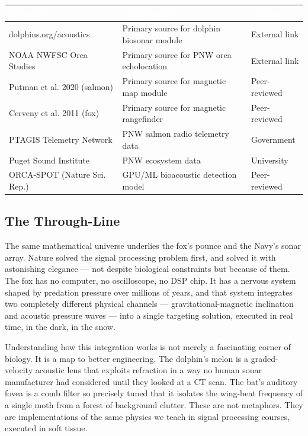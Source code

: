 \documentclass[11pt,letterpaper]{article}
\newcommand{\tableheader}[1]{\textbf{\sffamily\textcolor{white}{#1}}}
\begin{document}
\begin{center}
\begin{tabularx}{\textwidth}{L{3.5cm}XL{2.5cm}}
\toprule
{}
\tableheader{Document} & \tableheader{Relationship} & \tableheader{Status} \\
\midrule
dolphins.org/acoustics & Primary source for dolphin biosonar module & External link \\
NOAA NWFSC Orca Studies & Primary source for PNW orca echolocation & External link \\
Putman et al. 2020 (salmon) & Primary source for magnetic map module & Peer-reviewed \\
Cerveny et al. 2011 (fox) & Primary source for magnetic rangefinder & Peer-reviewed \\
PTAGIS Telemetry Network & PNW salmon radio telemetry data & Government \\
Puget Sound Institute & PNW ecosystem data & University \\
ORCA-SPOT (Nature Sci. Rep.) & GPU/ML bioacoustic detection model & Peer-reviewed \\
\bottomrule
\end{tabularx}
\end{center}

\subsection{The Through-Line}

The same mathematical universe underlies the fox's pounce and the Navy's sonar array. Nature solved the signal processing problem first, and solved it with astonishing elegance --- not despite biological constraints but because of them. The fox has no computer, no oscilloscope, no DSP chip. It has a nervous system shaped by predation pressure over millions of years, and that system integrates two completely different physical channels --- gravitational-magnetic inclination and acoustic pressure waves --- into a single targeting solution, executed in real time, in the dark, in the snow.

Understanding how this integration works is not merely a fascinating corner of biology. It is a map to better engineering. The dolphin's melon is a graded-velocity acoustic lens that exploits refraction in a way no human sonar manufacturer had considered until they looked at a CT scan. The bat's auditory fovea is a comb filter so precisely tuned that it isolates the wing-beat frequency of a single moth from a forest of background clutter. These are not metaphors. They are implementations of the same physics we teach in signal processing courses, executed in soft tissue.
\end{document}
